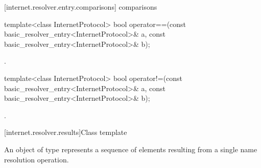 [internet.resolver.entry.comparisons]{ comparisons}

\begin{itemdecl}
template<class InternetProtocol>
  bool operator==(const basic_resolver_entry<InternetProtocol>& a,
                  const basic_resolver_entry<InternetProtocol>& b);
\end{itemdecl}

\begin{itemdescr}
\pnum
\returns {}.
\end{itemdescr}

\begin{itemdecl}
template<class InternetProtocol>
  bool operator!=(const basic_resolver_entry<InternetProtocol>& a,
                  const basic_resolver_entry<InternetProtocol>& b);
\end{itemdecl}

\begin{itemdescr}
\pnum
\returns {}.
\end{itemdescr}




%
[internet.resolver.results]{Class template }

\pnum
An object of type 
represents a sequence of  elements
resulting from a single name resolution operation.

